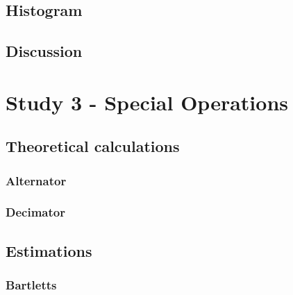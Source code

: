 \documentclass[a4paper,12pt]{article}
\begin{document}

\subsection{Histogram}



\subsection{Discussion}


\section{Study 3 - Special Operations}


\subsection{Theoretical calculations}


\subsubsection{Alternator}


\subsubsection{Decimator}


\subsection{Estimations}


\subsubsection{Bartletts}
\end{document}
